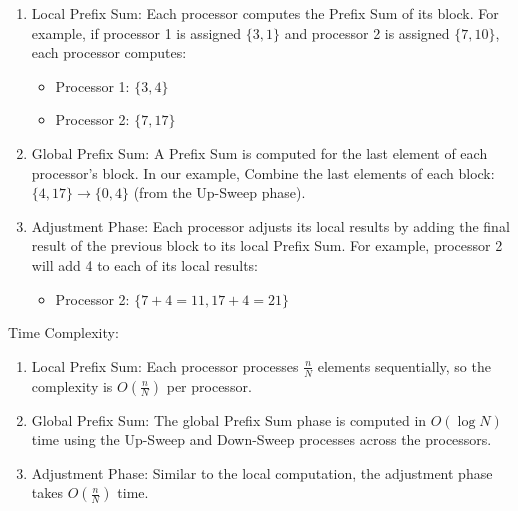 \documentclass[a4paper,10pt]{article}
\begin{document}
        \begin{enumerate}
            
            \item Local Prefix Sum: Each processor computes the Prefix Sum of its block. For example, if processor 1 is assigned $\{3, 1\}$ and processor 2 is assigned $\{7, 10\}$, each processor computes:
            
            \begin{itemize}
                
                \item Processor 1: $\{3, 4\}$

                \item Processor 2: $\{7, 17\}$

            \end{itemize}
            
            \item Global Prefix Sum: A Prefix Sum is computed for the last element of each processor's block. In our example, Combine the last elements of each block: $\{4, 17\} \rightarrow \{0, 4\}$ (from the Up-Sweep phase).

            \item Adjustment Phase: Each processor adjusts its local results by adding the final result of the previous block to its local Prefix Sum. For example, processor 2 will add 4 to each of its local results: 
            
            \begin{itemize}
                
                \item Processor 2: $\{7+4=11, 17+4=21\}$

            \end{itemize}

        \end{enumerate}

        {\bold Time Complexity:}

        \begin{enumerate}

            \item Local Prefix Sum: Each processor processes $\frac{n}{N}$ elements sequentially, so the complexity is $O(\frac{n}{N})$ per processor.

            \item Global Prefix Sum: The global Prefix Sum phase is computed in $O(\log N)$ time using the Up-Sweep and Down-Sweep processes across the processors.

            \item Adjustment Phase: Similar to the local computation, the adjustment phase takes $O(\frac{n}{N})$ time.

        \end{enumerate}
\end{document}
